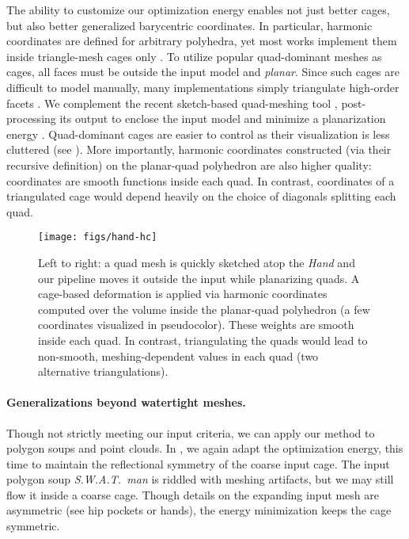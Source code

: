 The ability to customize our optimization energy enables not just better cages,
but also better generalized barycentric coordinates. In particular, harmonic
coordinates are defined for arbitrary polyhedra, yet most works implement them
inside triangle-mesh cages only \cite{HarmonicCoodinates07}.
%
To utilize popular quad-dominant meshes as cages, all faces must be outside the
input model and \emph{planar}.
%
Since such cages are difficult to model manually, many implementations simply
triangulate high-order facets \cite{HarmonicCoodinates07}.
%
We complement the recent sketch-based quad-meshing tool \cite{Takayama:2013},
post-processing its output to enclose the input model and minimize a
planarization energy \cite{poranne2013interactive}.
%
Quad-dominant cages are easier to control as their visualization is less
cluttered (see ).
%
More importantly, harmonic coordinates constructed (via their recursive
definition) on the planar-quad polyhedron are also higher quality: coordinates
are smooth functions inside each quad.
%
In contrast, coordinates of a triangulated cage would depend heavily on the
choice of diagonals splitting each quad.

\begin{figure}
  \texttt{[image: figs/hand-hc]}
  \caption{Left to right: a quad mesh is quickly sketched atop the \emph{Hand}
  and our pipeline moves it outside the input while planarizing quads. A
  cage-based deformation is applied via harmonic coordinates computed over the
  volume inside the planar-quad polyhedron (a few coordinates visualized in
  pseudocolor). These weights are smooth inside each quad. In contrast,
  triangulating the quads would lead to non-smooth, meshing-dependent values in
  each quad (two alternative triangulations).}
  \label{fig:hand-hc}
\end{figure}

\paragraph{Generalizations beyond watertight meshes.}
%
Though not strictly meeting our input criteria, we can apply our method to
polygon soups and point clouds.
%
In , we again adapt the optimization energy, this time to
maintain the reflectional symmetry of the coarse input cage.
%
The input polygon soup \emph{S.W.A.T.\ man} is riddled with meshing artifacts,
but we may still flow it inside a coarse cage.
%
Though details on the expanding input mesh are asymmetric (see hip pockets or
hands), the energy minimization keeps the cage symmetric.

